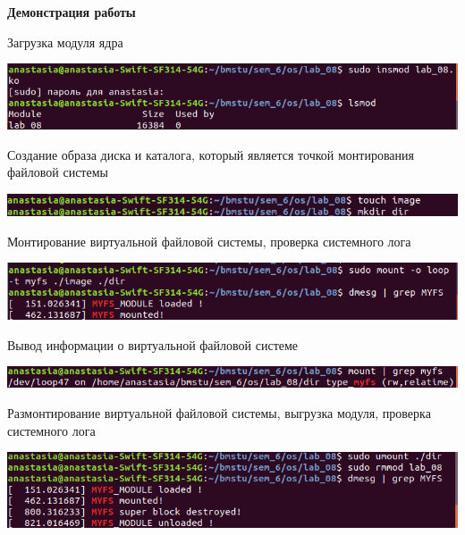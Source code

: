 \documentclass[a4paper,14pt]{extreport} %
\begin{document}
\textbf{Демонстрация работы}

Загрузка модуля ядра

\includegraphics[scale=0.9]{1.png}

Создание образа диска и каталога, который является точкой монтирования файловой системы

\includegraphics[scale=0.9]{2.png}

Монтирование виртуальной файловой системы, проверка системного  лога

\includegraphics[scale=0.9]{3.png}

Вывод информации о виртуальной файловой системе

\includegraphics[scale=0.9]{4.png}

Размонтирование виртуальной файловой системы, выгрузка модуля, проверка системного лога

\includegraphics[scale=0.9]{5.png}
\end{document}
